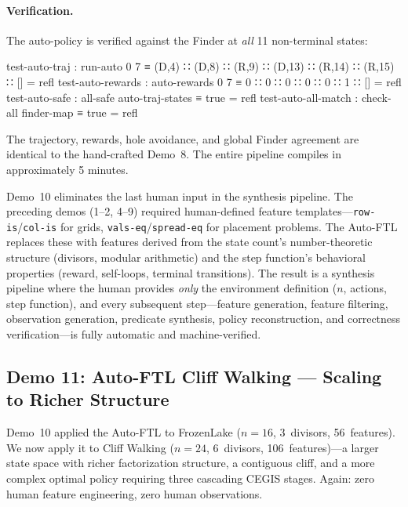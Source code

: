 \paragraph{Verification.}
The auto-policy is verified against the Finder at \emph{all} 11 non-terminal states:

\begin{spec}
test-auto-traj : run-auto 0 7
  ≡ (D,4) ∷ (D,8) ∷ (R,9) ∷ (D,13) ∷ (R,14) ∷ (R,15) ∷ []   = refl
test-auto-rewards    : auto-rewards 0 7 ≡ 0 ∷ 0 ∷ 0 ∷ 0 ∷ 0 ∷ 1 ∷ []  = refl
test-auto-safe       : all-safe auto-traj-states ≡ true                   = refl
test-auto-all-match  : check-all finder-map ≡ true                        = refl
\end{spec}

\noindent The trajectory, rewards, hole avoidance, and global Finder agreement are identical to the hand-crafted Demo~8.  The entire pipeline compiles in approximately 5 minutes.

\begin{remark}
Demo~10 eliminates the last human input in the synthesis pipeline.  The preceding demos (1--2, 4--9) required human-defined feature templates---\texttt{row-is}/\texttt{col-is} for grids, \texttt{vals-eq}/\texttt{spread-eq} for placement problems.  The Auto-FTL replaces these with features derived from the state count's number-theoretic structure (divisors, modular arithmetic) and the step function's behavioral properties (reward, self-loops, terminal transitions).  The result is a synthesis pipeline where the human provides \emph{only} the environment definition ($n$, actions, step function), and every subsequent step---feature generation, feature filtering, observation generation, predicate synthesis, policy reconstruction, and correctness verification---is fully automatic and machine-verified.
\end{remark}


\subsection{Demo 11: Auto-FTL Cliff Walking --- Scaling to Richer Structure}
\label{sec:e2e-autoftl-cliffwalk}

Demo~10 applied the Auto-FTL to FrozenLake ($n = 16$, 3~divisors, 56~features).  We now apply it to Cliff Walking ($n = 24$, 6~divisors, 106~features)---a larger state space with richer factorization structure, a contiguous cliff, and a more complex optimal policy requiring three cascading CEGIS stages.  Again: zero human feature engineering, zero human observations.

